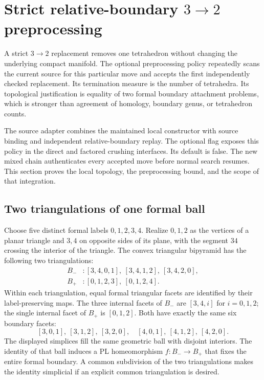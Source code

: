 \section{Strict relative-boundary \texorpdfstring{$3\to2$}{3-to-2} preprocessing}
\label{sec:strict-pachner32}

A strict $3\to2$ replacement removes one tetrahedron without changing the
underlying compact manifold.  The optional preprocessing policy repeatedly
scans the current source for this particular move and accepts the first
independently checked replacement.  Its termination measure is the number
of tetrahedra.  Its topological justification is equality of two formal
boundary attachment problems, which is stronger than agreement of homology,
boundary genus, or tetrahedron counts.

The source adapter  combines the maintained
local constructor  with source binding and independent
relative-boundary replay.  The optional flag 
exposes this policy in the direct and factored crushing interfaces.  Its
default is false.  The new mixed chain authenticates every accepted move
before normal search resumes.  This section proves the local topology,
the preprocessing bound, and the scope of that integration.

\subsection{Two triangulations of one formal ball}

Choose five distinct formal labels $0,1,2,3,4$.  Realize $0,1,2$ as the
vertices of a planar triangle and $3,4$ on opposite sides of its plane,
with the segment $34$ crossing the interior of the triangle.  The convex
triangular bipyramid has the following two triangulations:
\[
\begin{split}
 B_- &: [3,4,0,1],\ [3,4,1,2],\ [3,4,2,0],\\
 B_+ &: [0,1,2,3],\ [0,1,2,4].
\end{split}
\]
Within each triangulation, equal formal triangular facets are identified
by their label-preserving maps.  The three internal facets of $B_-$ are
$[3,4,i]$ for $i=0,1,2$; the single internal facet of $B_+$ is $[0,1,2]$.
Both have exactly the same six boundary facets:
\[
 [3,0,1],\ [3,1,2],\ [3,2,0],\quad
 [4,0,1],\ [4,1,2],\ [4,2,0].
\]
The displayed simplices fill the same geometric ball with disjoint
interiors.  The identity of that ball induces a PL homeomorphism
$f:B_-\longrightarrow B_+$ that fixes the entire formal boundary.
A common subdivision of the two triangulations makes the identity
simplicial if an explicit common triangulation is desired.

